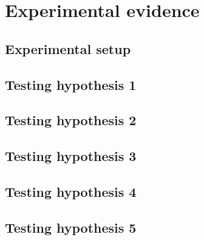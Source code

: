 \section{Experimental evidence}
\subsection{Experimental setup}

\subsection{Testing hypothesis 1}
\subsection{Testing hypothesis 2}
\subsection{Testing hypothesis 3}
\subsection{Testing hypothesis 4}
\subsection{Testing hypothesis 5}